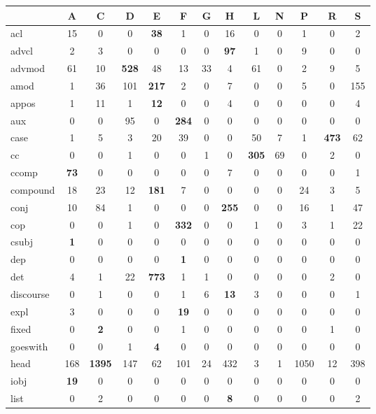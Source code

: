 \documentclass[11pt,a4paper]{article}
\begin{document}
\begin{table}[t]
\centering
\scriptsize
\setlength\tabcolsep{2pt}
\begin{tabular}{l|cccccccccccc}
 & A & C & D & E & F & G & H & L & N & P & R & S \\
\hline
acl & 15 & 0 & 0 & \textbf{38} & 1 & 0 & 16 & 0 & 0 & 1 & 0 & 2 \\
advcl & 2 & 3 & 0 & 0 & 0 & 0 & \textbf{97} & 1 & 0 & 9 & 0 & 0 \\
advmod & 61 & 10 & \textbf{528} & 48 & 13 & 33 & 4 & 61 & 0 & 2 & 9 & 5 \\
amod & 1 & 36 & 101 & \textbf{217} & 2 & 0 & 7 & 0 & 0 & 5 & 0 & 155 \\
appos & 1 & 11 & 1 & \textbf{12} & 0 & 0 & 4 & 0 & 0 & 0 & 0 & 4 \\
aux & 0 & 0 & 95 & 0 & \textbf{284} & 0 & 0 & 0 & 0 & 0 & 0 & 0 \\
case & 1 & 5 & 3 & 20 & 39 & 0 & 0 & 50 & 7 & 1 & \textbf{473} & 62 \\
cc & 0 & 0 & 1 & 0 & 0 & 1 & 0 & \textbf{305} & 69 & 0 & 2 & 0 \\
ccomp & \textbf{73} & 0 & 0 & 0 & 0 & 0 & 7 & 0 & 0 & 0 & 0 & 1 \\
compound & 18 & 23 & 12 & \textbf{181} & 7 & 0 & 0 & 0 & 0 & 24 & 3 & 5 \\
conj & 10 & 84 & 1 & 0 & 0 & 0 & \textbf{255} & 0 & 0 & 16 & 1 & 47 \\
cop & 0 & 0 & 1 & 0 & \textbf{332} & 0 & 0 & 1 & 0 & 3 & 1 & 22 \\
csubj & \textbf{1} & 0 & 0 & 0 & 0 & 0 & 0 & 0 & 0 & 0 & 0 & 0 \\
dep & 0 & 0 & 0 & 0 & \textbf{1} & 0 & 0 & 0 & 0 & 0 & 0 & 0 \\
det & 4 & 1 & 22 & \textbf{773} & 1 & 1 & 0 & 0 & 0 & 0 & 2 & 0 \\
discourse & 0 & 1 & 0 & 0 & 1 & 6 & \textbf{13} & 3 & 0 & 0 & 0 & 1 \\
expl & 3 & 0 & 0 & 0 & \textbf{19} & 0 & 0 & 0 & 0 & 0 & 0 & 0 \\
fixed & 0 & \textbf{2} & 0 & 0 & 1 & 0 & 0 & 0 & 0 & 0 & 1 & 0 \\
goeswith & 0 & 0 & 1 & \textbf{4} & 0 & 0 & 0 & 0 & 0 & 0 & 0 & 0 \\
head & 168 & \textbf{1395} & 147 & 62 & 101 & 24 & 432 & 3 & 1 & 1050 & 12 & 398 \\
iobj & \textbf{19} & 0 & 0 & 0 & 0 & 0 & 0 & 0 & 0 & 0 & 0 & 0 \\
list & 0 & 2 & 0 & 0 & 0 & 0 & \textbf{8} & 0 & 0 & 0 & 0 & 2 \\

\end{tabular}
\end{table}
\end{document}

